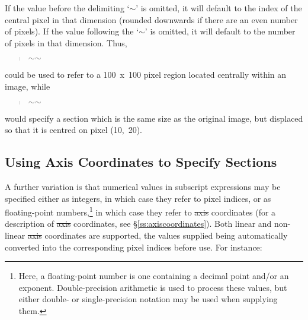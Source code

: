 If the value before the delimiting `$\sim$' is omitted, it will default to the
index of the central pixel in that dimension (rounded downwards if there are an
even number of pixels). If the value following the `$\sim$' is omitted, it will
default to the number of pixels in that dimension. Thus,

\small
\begin{quote}
\begin{center}
$\sim$$\sim$
\end{center}
\end{quote}
\normalsize

could be used to refer to a 100~x~100 pixel region located centrally within an
image, while

\small
\begin{quote}
\begin{center}
$\sim$$\sim$ \hi{)}
\end{center}
\end{quote}
\normalsize

would specify a section which is the same size as the original image, but
displaced so that it is centred on pixel (10,~20).

\subsection{\label{ss:axissections}Using Axis Coordinates to Specify Sections}

A further variation is that numerical values in subscript expressions may be
specified either as integers, in which case they refer to pixel indices, or as
floating-point numbers,\footnote{Here, a floating-point number is one containing
a decimal point and/or an exponent. Double-precision arithmetic is used to
process these values, but either double- or single-precision notation may be
used when supplying them.} in which case they refer to \st{axis\/} coordinates
(for a description of \st{axis\/} coordinates, see \S\ref{ss:axiscoordinates}).
Both linear and non-linear \st{axis\/} coordinates are supported, the values
supplied being automatically converted into the corresponding pixel indices
before use. For instance:

\small
\begin{quote}
\begin{center}
\end{center}
\end{quote}
\normalsize

